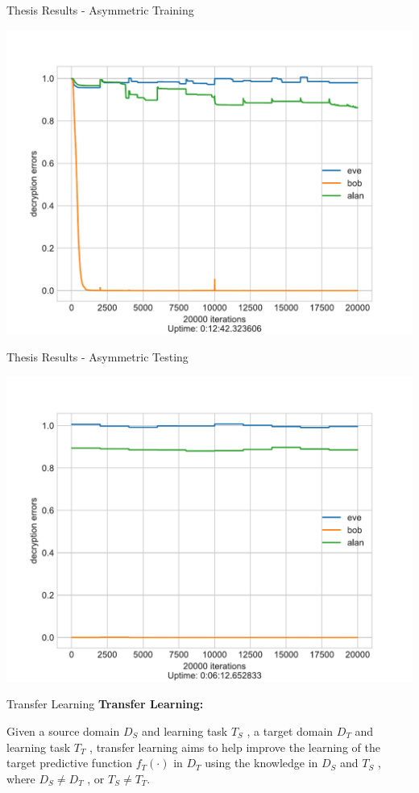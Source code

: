 \documentclass{beamer}
\begin{document}
		\begin{frame}{Thesis Results - Asymmetric Training}
			\begin{center}
				\includegraphics[height=0.9\textheight]{neurencoder-asymmetric-training}
			\end{center}
		\end{frame}
		\begin{frame}{Thesis Results - Asymmetric Testing}
			\begin{center}
				\includegraphics[height=0.9\textheight]{neurencoder-asymmetric-testing}
			\end{center}
		\end{frame}
		\begin{frame}{Transfer Learning}
			\textbf{Transfer Learning:}\\\vfill
			\hfill\begin{minipage}{0.93\textwidth}
				
			\end{minipage}
			{\centering
				Given a source domain $ D_{S} $ and learning task $ T_{S} $ , a target domain $ D_{T} $ and learning task
				$ T_{T} $ , transfer learning aims to help improve the learning of the
				target predictive function $ f_{T}(\cdot) $ in $ D_{T} $ using the knowledge in
				$ D_{S} $ and $ T_{S} $ , where $ D_{S} \neq D_{T} $ , or $ T_{S} \neq T_{T} $.~\citep{5288526}
				\par} 
		\end{frame}
\end{document}
